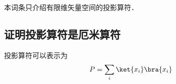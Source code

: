 

本词条只介绍有限维矢量空间的投影算符．

\subsection{证明投影算符是厄米算符}
投影算符可以表示为
\begin{equation}
P = \sum_i \ket{x_i}\bra{x_i}
\end{equation}

